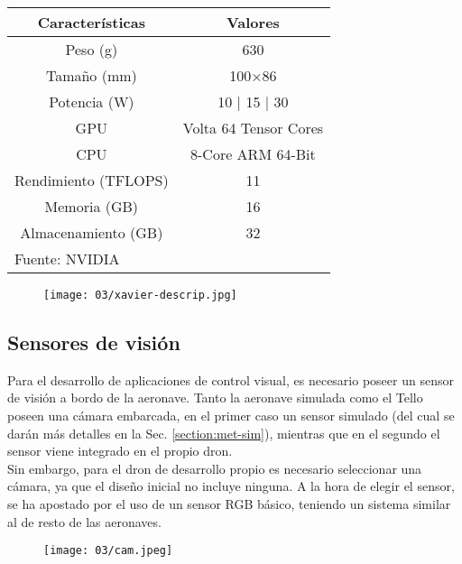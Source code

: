 \documentclass[../main.tex]{subfiles}
\begin{document}
\begin{table}[H]
	{\begin{tabular}{|c|c|}
		\hline
		\textbf{Características} & \textbf{Valores} \\
		\hline
		Peso (g)        & 630 \\
		\hline
        Tamaño (mm)     & 100×86 \\
        \hline
        Potencia (W)    & 10 | 15 | 30 \\
        \hline
        GPU             & Volta  64 Tensor Cores \\
        \hline
        CPU             & 8-Core ARM 64-Bit \\
        \hline
        Rendimiento (TFLOPS) & 11 \\
        \hline
        Memoria (GB)    & 16 \\
        \hline 
        Almacenamiento (GB)    & 32 \\
        \hline
		\multicolumn{2}{l}{Fuente: NVIDIA}
	\end{tabular}}
\end{table}

\begin{figure}[!ht]
 	{\texttt{[image: 03/xavier-descrip.jpg]}}
\end{figure}

\clearpage
\subsection{Sensores de visión} \label{section:met-visión}
Para el desarrollo de aplicaciones de control visual, es necesario poseer un sensor de visión a bordo de la aeronave. Tanto la aeronave simulada como el Tello poseen una cámara embarcada, en el primer caso un sensor simulado (del cual se darán más detalles en la Sec. \ref{section:met-sim}), mientras que en el segundo el sensor viene integrado en el propio dron. \\
Sin embargo, para el dron de desarrollo propio es necesario seleccionar una cámara, ya que el diseño inicial no incluye ninguna. A la hora de elegir el sensor, se ha apostado por el uso de un sensor RGB básico, teniendo un sistema similar al de resto de las aeronaves.

\begin{figure}[!ht]
 	{\texttt{[image: 03/cam.jpeg]}}
\end{figure}
\end{document}
